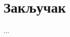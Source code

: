 \documentclass[12pt,oneside]{memoir}
\begin{document}
\chapter{Закључак}
...

\literatura
\end{document}

